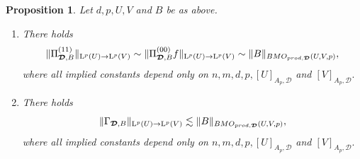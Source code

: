 \documentclass{article}
\newtheorem{proposition}[theorem]{Proposition}
\theoremstyle{definition}
\theoremstyle{remark}
\numberwithin{equation}{section}
\newcommand{\bfD}{\bm{\mathcal{D}}}
\newcommand{\Lp}[1]{\mathrm{L}^{#1}}
\newcommand{\1}{\mathbf{1}}
\begin{document}
    \begin{proposition}
        \label{prop:pureparaproducts}
        Let $d,p,U,V$ and $B$ be as above.
        \begin{enumerate}
            \item[(a)] There holds
            \begin{equation*}
                \Vert\Pi_{\bfD,B}^{(11)}\Vert_{\Lp{p}(U)\rightarrow \Lp{p}(V)}\sim\Vert\Pi_{\bfD,B}^{(00)}f\Vert_{\Lp{p}(U)\rightarrow \Lp{p}(V)}\sim\Vert B\Vert_{\emph{BMO}_{\emph{prod},\bfD}(U,V,p)},
            \end{equation*}
    where all implied constants depend only on $n,m,d,p,[U]_{A_p,\bfD}$ and $[V]_{A_p,\bfD}.$

            \item[(b)] There holds
            \begin{equation*}
                \Vert\Gamma_{\bfD,B}\Vert_{\Lp{p}(U)\rightarrow \Lp{p}(V)}\lesssim\Vert B\Vert_{\emph{BMO}_{\emph{prod},\bfD}(U,V,p)},
            \end{equation*}
        where all implied constants depend only on $n,m,d,p,[U]_{A_p,\bfD}$ and $[V]_{A_p,\bfD}.$
        \end{enumerate}
    \end{proposition}
\end{document}
